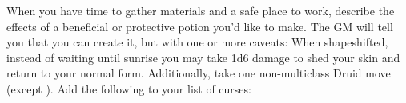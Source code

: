 \documentclass[darkmode]{dw_playbook}
\begin{document}
    {
            {When you have time to gather materials and a safe place to work, describe the effects of a beneficial or protective potion you’d like to make.  The GM will tell you that you can create it, but with one or more caveats:
            \gapSm
            \gapSm
            \gapSm
            \gapSm
            }
        \gap
            {
            When shapeshifted, instead of waiting until sunrise you may take 1d6 damage to shed your skin and return to your normal form.  Additionally, take one non-multiclass Druid move (except ).}
        \gap
            {Add the following to your list of curses:
            \gapSm
            }
    }

\clearpage
~
\end{document}
